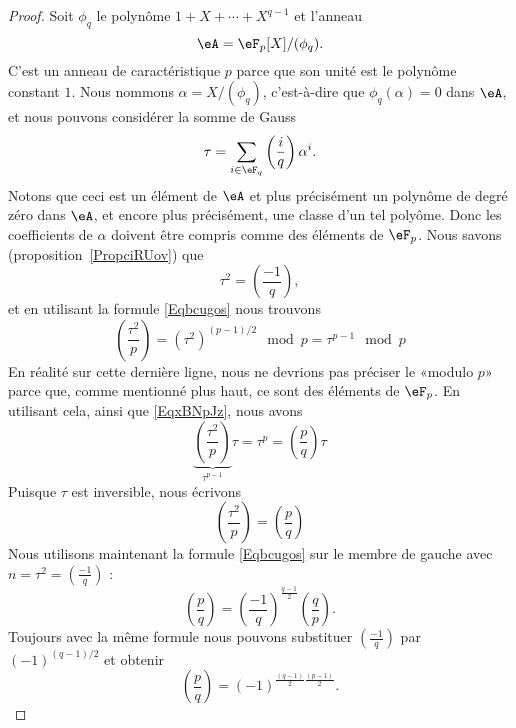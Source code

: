 \begin{proof}
	Soit \( \phi_q\) le polynôme \( 1+X+\cdots+X^{q-1}\) et l'anneau
	\begin{equation}
		\eA=\eF_p[X]/(\phi_q).
	\end{equation}
	C'est un anneau de caractéristique \( p\) parce que son unité est le polynôme constant \( 1\). Nous nommons \( \alpha=X/(\phi_q)\), c'est-à-dire que \( \phi_q(\alpha)=0\) dans \( \eA\), et nous pouvons considérer la somme de Gauss
	\begin{equation}
		\tau=\sum_{i\in \eF_q}\left(\frac{i}{q}\right)\alpha^i.
	\end{equation}
	Notons que ceci est un élément de \( \eA\) et plus précisément un polynôme de degré zéro dans \( \eA\), et encore plus précisément, une classe d'un tel polyôme. Donc les coefficients de \( \alpha\) doivent être compris comme des éléments de \( \eF_p\).
	Nous savons (proposition~\ref{PropciRUov}) que
	\begin{equation}
		\tau^2=\left(\frac{-1}{q}\right),
	\end{equation}
	et en utilisant la formule \eqref{Eqbcugos} nous trouvons
	\begin{equation}
		\left(\frac{\tau^2}{p}\right)=(\tau^2)^{(p-1)/2}\mod p=\tau^{p-1}\mod p
	\end{equation}
	En réalité sur cette dernière ligne, nous ne devrions pas préciser le «modulo \( p\)» parce que, comme mentionné plus haut, ce sont des éléments de \( \eF_p\). En utilisant cela, ainsi que \eqref{EqxBNpJz}, nous avons
	\begin{equation}
		\underbrace{\left(\frac{\tau^2}{p}\right)}_{\tau^{p-1}}\tau=\tau^p=\left(\frac{p}{q}\right)\tau
	\end{equation}
	Puisque \( \tau\) est inversible, nous écrivons
	\begin{equation}
		\left(\frac{\tau^2}{p}\right)=\left(\frac{p}{q}\right)
	\end{equation}
	Nous utilisons maintenant la formule \eqref{Eqbcugos} sur le membre de gauche avec \( n=\tau^2=\left(\frac{-1}{q}\right)\) :
	\begin{equation}
		\left(\frac{p}{q}\right)=\left(\frac{-1}{q}\right)^{\frac{ q-1 }{2}}\left(\frac{q}{p}\right).
	\end{equation}
	Toujours avec la même formule nous pouvons substituer \( \left(\frac{-1}{q}\right)\) par \( (-1)^{(q-1)/2}\) et obtenir
	\begin{equation}
		\left(\frac{p}{q}\right)=(-1)^{\frac{ (q-1) }{2}\frac{ (p-1) }{2}}.
	\end{equation}
\end{proof}

